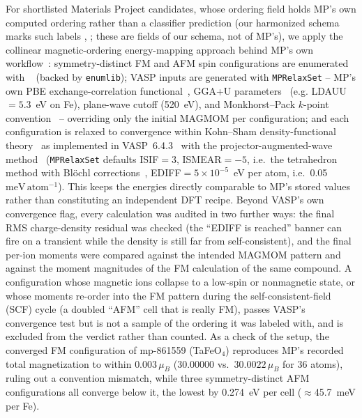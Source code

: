 \documentclass[aps,prb,preprint,superscriptaddress,longbibliography,nofootinbib]{revtex4-2}
\newcommand{\meVat}{\ensuremath{\mathrm{meV\,atom^{-1}}}}
\begin{document}
For shortlisted Materials Project candidates, whose ordering field holds MP's own computed ordering rather
than a classifier prediction (our harmonized schema marks such labels ,
; these are fields of our schema, not of MP's), we apply the
collinear magnetic-ordering energy-mapping approach behind MP's own workflow~\cite{horton2019}:
symmetry-distinct FM and AFM spin configurations are enumerated with
~\cite{ong2013} (backed by \texttt{enumlib}); VASP inputs are
generated with \texttt{MPRelaxSet} -- MP's own PBE exchange-correlation functional~\cite{perdew1996}, GGA+U
parameters~\cite{dudarev1998,wang2006,jain2011} (e.g. LDAUU$=5.3$~eV on Fe), plane-wave cutoff (520~eV), and
Monkhorst--Pack $k$-point convention~\cite{monkhorst1976} -- overriding only the initial MAGMOM per
configuration; and each configuration is relaxed to convergence within Kohn--Sham density-functional
theory~\cite{hohenberg1964,kohn1965} as implemented in VASP~6.4.3~\cite{kresse1996} with the
projector-augmented-wave method~\cite{blochl1994,kresse1999} (\texttt{MPRelaxSet} defaults ISIF$=3$,
ISMEAR$=-5$, i.e.\ the tetrahedron method with Bl\"ochl corrections~\cite{blochl1994tet},
EDIFF$=5\times10^{-5}$~eV per atom, i.e.\ 0.05~\meVat). This keeps the energies directly comparable to MP's
stored values rather than constituting an independent DFT recipe. Beyond VASP's own convergence flag, every
calculation was audited in two further ways: the final RMS charge-density residual was checked (the ``EDIFF is
reached'' banner can fire on a transient while the density is still far from self-consistent), and the final
per-ion moments were compared against the intended MAGMOM pattern and against the moment magnitudes of the FM
calculation of the same compound. A configuration whose magnetic ions collapse to a low-spin or nonmagnetic
state, or whose moments re-order into the FM pattern during the self-consistent-field (SCF) cycle (a doubled ``AFM'' cell that is really
FM), passes VASP's convergence test but is not a sample of the ordering it was labeled with, and is excluded
from the verdict rather than counted. As a check of the setup, the converged FM configuration of mp-861559
(TaFeO$_4$) reproduces MP's recorded total magnetization to within $0.003\,\mu_B$ (30.00000 vs.\
$30.0022\,\mu_B$ for 36 atoms), ruling out a convention mismatch, while three symmetry-distinct AFM
configurations all converge below it, the lowest by 0.274~eV per cell ($\approx$45.7~meV per Fe).
\end{document}
